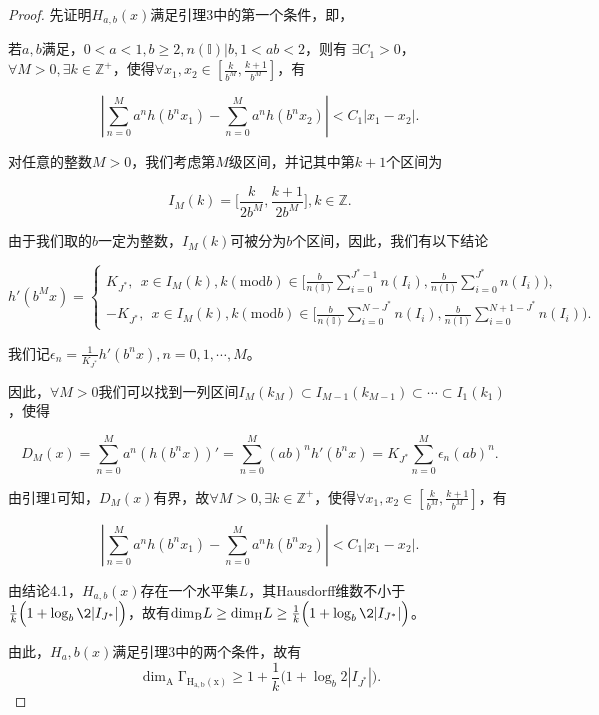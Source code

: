 \begin{proof}

    先证明$H_{a,b}(x)$满足引理3中的第一个条件，即，

    若$a,b$满足，$0<a<1,b\ge2,n(\mathbb{I})|b,1<ab<2$，则有 $\exists C_1>0$，
    $\forall M>0,\exists k\in\mathbb{Z}^+$，使得$\forall x_1,x_2\in [\frac{k}{b^M},\frac{k+1}{b^M}]$，有

    $$
    |\sum_{n=0}^Ma^nh(b^nx_1)-\sum_{n=0}^Ma^nh(b^nx_2)|<C_1|x_1-x_2|.
    $$

    对任意的整数$M>0$，我们考虑第$M$级区间，并记其中第$k+1$个区间为

    $$
    I_M(k)=\big[\frac{k}{2b^M},\frac{k+1}{2b^M}\big],k\in\mathbb{Z}.
    $$

    由于我们取的$b$一定为整数，$I_M(k)$可被分为$b$个区间，因此，我们有以下结论

    $$
    h'(b^Mx)=\begin{cases}
        K_{J^*},~~x\in I_M(k),k (\mathrm{mod}b) \in {[}\frac{b}{n(\mathbb{I})}\sum_{i=0}^{J^*-1}n(I_i),\frac{b}{n(\mathbb{I})}\sum_{i=0}^{J^*}n(I_i){)},\\
        -K_{J^*},~~x\in I_M(k),k(\mathrm{mod}b) \in {[}\frac{b}{n(\mathbb{I})}\sum_{i=0}^{N-J^*}n(I_i),\frac{b}{n(\mathbb{I})}\sum_{i=0}^{N+1-J^*}n(I_i){)}.
    \end{cases}
    $$

    我们记$\epsilon_n=\frac{1}{K_{J^*}}h'(b^nx),n=0,1,\cdots,M$。

    因此，$\forall M>0$我们可以找到一列区间$I_M(k_M)\subset I_{M-1}(k_{M-1})\subset\cdots\subset I_1(k_1)$，使得

    $$
    D_M(x)=\sum_{n=0}^Ma^n(h(b^nx))'=\sum_{n=0}^M(ab)^nh'(b^nx)=K_{J^*}\sum_{n=0}^M\epsilon_n(ab)^n.
    $$

    由引理1可知，$D_M(x)$有界，故$\forall M>0,\exists k\in\mathbb{Z}^+$，使得$\forall x_1,x_2\in [\frac{k}{b^M},\frac{k+1}{b^M}]$，有

    $$
    |\sum_{n=0}^Ma^nh(b^nx_1)-\sum_{n=0}^Ma^nh(b^nx_2)|<C_1|x_1-x_2|.
    $$

    由结论4.1，$H_{a,b}(x)$存在一个水平集$L$，其Hausdorff维数不小于$\frac{1}{k}\Big(1+\log_b\2|I_{J^*}|\Big)$，故有$\mathrm{\dim_B}L\ge\mathrm{\dim_H}L\ge\frac{1}{k}\Big(1+\log_b\2|I_{J^*}|\Big)$。

    由此，$H_a,b(x)$满足引理3中的两个条件，故有
    $$
        \mathrm{\dim_A\Gamma_{H_{a,b}(x)}}\ge1+\frac{1}{k}\big(1+\log_b2|I_{J^*}|\big).
    $$
\end{proof}
